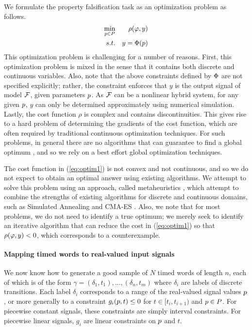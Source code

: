 We formulate the property falsification task as an optimization problem as follows.
\begin{eqnarray} \label{eq:optim1}
\min_{p \in P} && \rho(\varphi,y) \\ \nonumber
s.t. && y=\Phi(p)
\end{eqnarray}
This optimization problem is challenging for a number of reasons. First, this optimization problem is mixed in the sense that it contains both discrete and continuous variables. Also, note that the above constraints defined by $\Phi$ 
are not specified explicitly; rather, the constraint enforces that $y$ is the output signal of model $\mathcal{F}$, given parameters $p$.
As $\mathcal{F}$ can be a nonlinear hybrid system, for any given $p$, $y$ can only be determined approximately using numerical simulation. 
Lastly, the cost function $\rho$ is complex and contains discontinuities.
This gives rise to a hard problem of determining the gradients of the cost function, which are often required by traditional continuous optimization techniques. 
For such problems, in general there are no algorithms that can guarantee to find a global optimum \cite{FloudasPardalos2009}, and so we rely on a best effort global optimization techniques. 

The cost function in (\ref{eq:optim1}) is not convex and not continuous, and so we do not expect to obtain an optimal answer using existing algorithms. We attempt to solve this problem using an approach, called metaheuristics \cite{dreo:hal-01341683}, which attempt to combine the strengths of existing algorithms for discrete and continuous domains, such as Simulated Annealing \cite{Kirkpatrick83optimizationby} and CMA-ES \cite{hansen2006eda}. Also, we note that for most problems, we do not need to identify a true optimum; we merely seek to identify an iterative algorithm that can reduce the cost in (\ref{eq:optim1}) so that $\rho(\varphi,y)<0$, which corresponds to a counterexample.

\paragraph{Mapping timed words to real-valued input signals}\label{sec:KS}\label{sec:backward}
We now know how to generate a good sample of $N$ timed words of length $n$, each of which is of the form $\gamma = (\delta_1, t_1), \ldots, (\delta_n, t_m)$ where $\delta_i$ are labels of discrete transitions. Each label $\delta_i$ corresponds to a range of the real-valued signal values $p$, or more generally to a constraint $g_i(p, t) \le 0$ for $t \in [t_i, t_{i+1})$ and $p \in P$. For piecewise constant signals, these constraints are simply interval constraints. For piecewise linear signals, $g_i$ are linear constraints on $p$ and $t$. 

